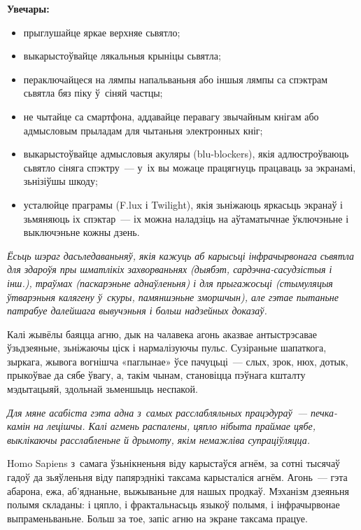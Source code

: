 \textbf{Увечары:}
\begin{itemize}
  \item прыглушайце яркае верхняе сьвятло;
  \item выкарыстоўвайце лякальныя крыніцы сьвятла;
  \item пераключайцеся на лямпы напальваньня або іншыя лямпы са спэктрам сьвятла бяз піку ў~сіняй частцы;
  \item не чытайце са смартфона, аддавайце перавагу звычайным кнігам або адмысловым прыладам для чытаньня электронных кніг;
  \item выкарыстоўвайце адмысловыя акуляры (blu-blockers), якія адлюстроўваюць сьвятло сіняга спэктру~--- у~іх вы можаце працягнуць працаваць за экранамі, зьнізіўшы шкоду;
  \item усталюйце праграмы (F.lux і Twilight), якія зьніжаюць яркасьць экранаў і зьмяняюць іх спэктар~--- іх можна наладзіць на аўтаматычнае ўключэньне і выключэньне кожны дзень.
\end{itemize}


\emph{Ёсьць шэраг дасьледаваньняў, якія кажуць аб карысьці інфрачырвонага сьвятла для здароўя пры шматлікіх захворваньнях (дыябэт, сардэчна-сасудзістыя і інш.), траўмах (паскарэньне аднаўленьня) і для прыгажосьці (стымуляцыя ўтварэньня калягену ў~скуры, памяншэньне зморшчын), але гэтае пытаньне патрабуе далейшага вывучэньня і больш надзейных доказаў.}

Калі жывёлы баяцца агню, дык на чалавека агонь аказвае антыстрэсавае ўзьдзеяньне, зьніжаючы ціск і нармалізуючы пульс. Сузіраньне шапаткога, зыркага, жывога вогнішча «паглынае» ўсе пачуцьці~--- слых, зрок, нюх, дотык, прыкоўвае да сябе ўвагу, а, такім чынам, становіцца пэўнага кшталту мэдытацыяй, здольнай зьменшыць неспакой.

\emph{Для мяне асабіста гэта адна з~самых расслабляльных працэдураў~--- печка-камін на лецішчы. Калі агмень распалены, цяпло нібыта праймае цябе, выклікаючы расслабленьне й дрымоту, якім немажліва супраціўляцца.}

Homo Sapiens з~самага ўзьнікненьня віду карыстаўся агнём, за сотні тысячаў гадоў да зьяўленьня віду папярэднікі таксама карысталіся агнём. Агонь~--- гэта абарона, ежа, аб'яднаньне, выжываньне для нашых продкаў. Мэханізм дзеяньня полымя складаны: і цяпло, і фрактальнасьць языкоў полымя, і інфрачырвонае выпраменьваньне. Больш за тое, запіс агню на экране таксама працуе.

